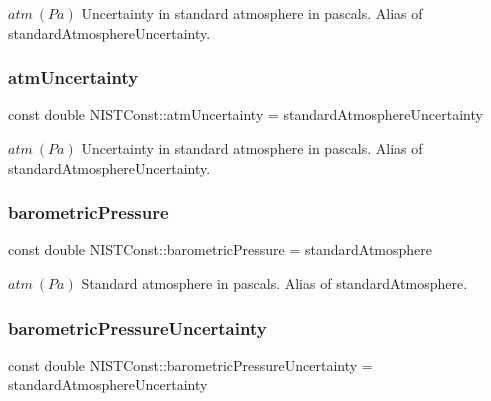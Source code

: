 $atm \ (Pa)$ Uncertainty in standard atmosphere in pascals. Alias of standard\+Atmosphere\+Uncertainty. \mbox{\label{group___n_i_s_t_const-_standard_atmosphere_gace6ef7e45b2b26b9f48c8495d8a349d0}} 
\subsubsection{\texorpdfstring{atm\+Uncertainty}{atmUncertainty}}
{\footnotesize\ttfamily const double N\+I\+S\+T\+Const\+::atm\+Uncertainty = standard\+Atmosphere\+Uncertainty}

$atm \ (Pa)$ Uncertainty in standard atmosphere in pascals. Alias of standard\+Atmosphere\+Uncertainty. \mbox{\label{group___n_i_s_t_const-_standard_atmosphere_ga09e2a2bce1e1f38985f98c22d5a8d43d}} 
\subsubsection{\texorpdfstring{barometric\+Pressure}{barometricPressure}}
{\footnotesize\ttfamily const double N\+I\+S\+T\+Const\+::barometric\+Pressure = standard\+Atmosphere}

$atm \ (Pa)$ Standard atmosphere in pascals. Alias of standard\+Atmosphere. \mbox{\label{group___n_i_s_t_const-_standard_atmosphere_gaf437683a9ddd84a22147c418405d41f2}} 
\subsubsection{\texorpdfstring{barometric\+Pressure\+Uncertainty}{barometricPressureUncertainty}}
{\footnotesize\ttfamily const double N\+I\+S\+T\+Const\+::barometric\+Pressure\+Uncertainty = standard\+Atmosphere\+Uncertainty}

